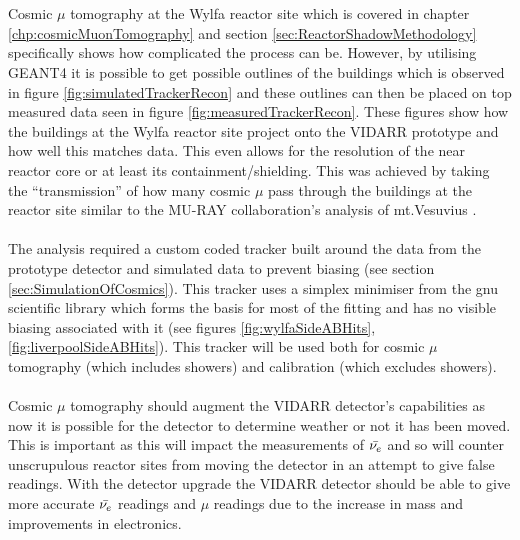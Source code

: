 \\\\Cosmic $\mu$ tomography at the Wylfa reactor site which is covered in chapter  \ref{chp:cosmicMuonTomography} and section \ref{sec:ReactorShadowMethodology} specifically shows how complicated the process can be. However, by utilising GEANT4 it is possible to get possible outlines of the buildings which is observed in figure \ref{fig:simulatedTrackerRecon} and these outlines can then be placed on top measured data seen in figure \ref{fig:measuredTrackerRecon}. These figures show how the buildings at the Wylfa reactor site project onto the VIDARR prototype and how well this matches data. This even allows for the resolution of the near reactor core or at least its containment/shielding. This was achieved by taking the ``transmission'' of how many cosmic $\mu$ pass through the buildings at the reactor site similar to the  MU-RAY collaboration's analysis of mt.Vesuvius \cite{Ambrosino_2014}.    
\\\\The analysis required a custom coded tracker built around the data from the prototype detector and simulated data to prevent biasing (see section \ref{sec:SimulationOfCosmics}). This tracker uses a simplex minimiser from the gnu scientific library \cite{galassi2002gnu} which forms the basis for most of the fitting and has no visible biasing associated with it (see figures \ref{fig:wylfaSideABHits}, \ref{fig:liverpoolSideABHits}). This tracker will be used both for cosmic $\mu$ tomography (which includes showers) and calibration (which excludes showers). 
\\\\Cosmic $\mu$ tomography should augment the VIDARR detector's capabilities as now it is possible for the detector to determine weather or not it has been moved. This is important as this will impact the measurements of $\Bar{\nu_e}$ and so will counter unscrupulous reactor sites from moving the detector in an attempt to give false readings. With the detector upgrade the VIDARR detector should be able to give more accurate $\Bar{\nu_e}$ readings and $\mu$ readings due to the increase in mass and improvements in electronics. 